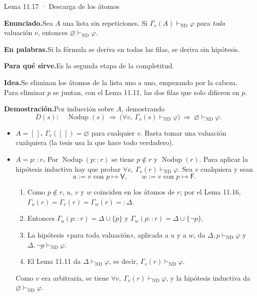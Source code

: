 \documentclass[11pt,a4paper]{article}
\newcommand{\campo}[1]{\par\smallskip\noindent\textbf{#1}\enspace}
\newcommand{\enunciado}{\campo{Enunciado.}}
\newcommand{\palabras}{\campo{En palabras.}}
\newcommand{\sirve}{\campo{Para qué sirve.}}
\newcommand{\idea}{\campo{Idea.}}
\newcommand{\prueba}{\campo{Demostración.}}
\newcommand{\Provnd}{\vdash_{\mathrm{ND}}}
\newcommand{\Not}{\neg}
\newcommand{\Nodup}{\operatorname{Nodup}}
\newcommand{\V}{\mathsf{V}}
\newcommand{\F}{\mathsf{F}}
\begin{document}
\begin{resultado}{Lema 11.17 · Descarga de los átomos}
\enunciado Sea \(A\) una lista sin repeticiones. Si
\(\Gamma_v(A)\Provnd\varphi\) para \emph{toda} valuación \(v\), entonces
\(\varnothing\Provnd\varphi\).

\palabras Si la fórmula se deriva en todas las filas, se deriva sin
hipótesis.

\sirve Es la segunda etapa de la completitud.

\idea Se eliminan los átomos de la lista uno a uno, empezando por la cabeza.
Para eliminar \(p\) se juntan, con el Lema 11.11, las dos filas que solo
difieren en \(p\).

\prueba Por inducción sobre \(A\), demostrando
\[
D(s):\quad \Nodup(s)\ \Rightarrow\ \big(\forall v,\ \Gamma_v(s)\Provnd\varphi\big)\ \Rightarrow\ \varnothing\Provnd\varphi .
\]
\begin{itemize}
  \item \textbf{\(A=[\,]\).} \(\Gamma_v([\,])=\varnothing\) para cualquier
    \(v\). Basta tomar una valuación cualquiera (la tesis usa la que hace
    todo verdadero).
  \item \textbf{\(A=p::r\).} Por \(\Nodup(p::r)\) se tiene \(p\notin r\) y
    \(\Nodup(r)\). Para aplicar la hipótesis inductiva hay que probar
    \(\forall v,\ \Gamma_v(r)\Provnd\varphi\). Sea \(v\) cualquiera y sean
    \[
    u:=v\text{ con }p\mapsto\V,\qquad w:=v\text{ con }p\mapsto\F .
    \]
    \begin{enumerate}
      \item Como \(p\notin r\), \(u\), \(v\) y \(w\) coinciden en los átomos
        de \(r\); por el Lema 11.16,
        \(\Gamma_u(r)=\Gamma_v(r)=\Gamma_w(r)=:\Delta\).
      \item Entonces \(\Gamma_u(p::r)=\Delta\cup\{p\}\) y
        \(\Gamma_w(p::r)=\Delta\cup\{\Not p\}\).
      \item La hipótesis «para toda valuación», aplicada a \(u\) y a \(w\),
        da \(\Delta,p\Provnd\varphi\) y \(\Delta,\Not p\Provnd\varphi\).
      \item El Lema 11.11 da \(\Delta\Provnd\varphi\), es decir,
        \(\Gamma_v(r)\Provnd\varphi\).
    \end{enumerate}
    Como \(v\) era arbitraria, se tiene \(\forall v,\ \Gamma_v(r)\Provnd\varphi\),
    y la hipótesis inductiva da \(\varnothing\Provnd\varphi\).
\end{itemize}
\end{resultado}
\end{document}
